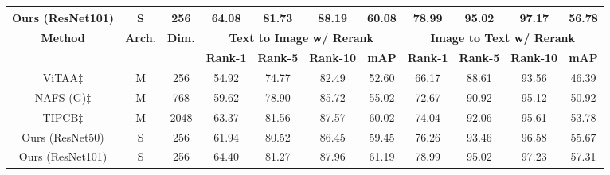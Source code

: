\documentclass{bmvc2k}
\newcommand{\first}[1]{\textcolor{myred}{#1}}
\newcommand{\second}[1]{\textcolor{myblue}{#1}}
\begin{document}
\begin{table}[t]
\begin{center}
{\begin{tabular}{|c|c|c|c|c|c|c|c|c|c|c|}
\rowcolor[RGB]{230,230,230}
Ours (ResNet101)                            & S  & 256                                   & \first{64.08}           & \second{81.73}           & \second{88.19}            & \first{60.08}        & \first{78.99}           & \first{95.02}           & \first{97.17}            & \first{56.78}        \\ \hline \hline
\multirow{2}{*}{\textbf{Method}} & \multirow{2}{*}{\textbf{Arch.}} & \multirow{2}{*}{\textbf{Dim.}} & \multicolumn{4}{c|}{\textbf{Text to Image w/ Rerank}}              & \multicolumn{4}{c|}{\textbf{Image to Text w/ Rerank}}              \\ \cline{4-11} 
            &                     &                                       & \textbf{Rank-1} & \textbf{Rank-5} & \textbf{Rank-10} & \textbf{mAP} & \textbf{Rank-1} & \textbf{Rank-5} & \textbf{Rank-10} & \textbf{mAP} \\ \hline \hline
ViTAA$\ddagger$ \cite{wang2020vitaa}                           & M & 256                              & 54.92           & 74.77           & 82.49            & 52.60        & 66.17           & 88.61           & 93.56            & 46.39        \\ \hline
NAFS (G)$\ddagger$ \cite{gao2021contextual}                           & M  & 768                            & 59.62           & 78.90           & 85.72            & 55.02            & 72.67           & 90.92          & 95.12            & 50.92            \\ \hline
TIPCB$\ddagger$ \cite{chen2021tipcb}                           & M    & 2048                          & \second{63.37}           & \first{81.56}           & \second{87.57}            & \second{60.02}            & 74.04           & 92.06          & 95.61            & 53.78            \\ \hline
\rowcolor[RGB]{230,230,230}
Ours (ResNet50)                             & S     & 256                                & 61.94           & 80.52           & 86.45            & 59.45        & \second{76.26}           & \second{93.46}           & \second{96.58}            & \second{55.67}        \\ \hline
\rowcolor[RGB]{230,230,230}
Ours (ResNet101)                             & S   & 256                                  & \first{64.40}           & \second{81.27}           & \first{87.96}            & \first{61.19}        & \first{78.99}           & \first{95.02}           & \first{97.23}            & \first{57.31}        \\ \hline
\end{tabular}
}
\end{center}
\end{table}
\end{document}
